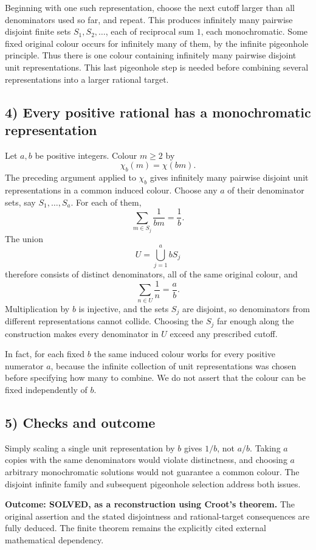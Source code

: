 Beginning with one such representation, choose the next cutoff larger
than all denominators used so far, and repeat. This produces infinitely
many pairwise disjoint finite sets $S_1,S_2,\ldots$, each of reciprocal
sum $1$, each monochromatic. Some fixed original colour occurs for
infinitely many of them, by the infinite pigeonhole principle.
Thus there is one colour containing infinitely many pairwise disjoint
unit representations. This last pigeonhole step is needed before
combining several representations into a larger rational target.

\subsection{4) Every positive rational has a monochromatic representation}
Let $a,b$ be positive integers. Colour $m\geq2$ by
\[
 \chi_b(m)=\chi(bm).
\]
The preceding argument applied to $\chi_b$ gives infinitely many
pairwise disjoint unit representations in a common induced colour.
Choose any $a$ of their denominator sets, say $S_1,\ldots,S_a$.
For each of them,
\[
 \sum_{m\in S_j}\frac1{bm}=\frac1b.
\]
The union
\[
 U=\bigcup_{j=1}^a bS_j
\]
therefore consists of distinct denominators, all of the same original
colour, and
\[
 \sum_{n\in U}\frac1n=\frac ab.
\]
Multiplication by $b$ is injective, and the sets $S_j$ are disjoint,
so denominators from different representations cannot collide.
Choosing the $S_j$ far enough along the construction makes every
denominator in $U$ exceed any prescribed cutoff.

In fact, for each fixed $b$ the same induced colour works for every
positive numerator $a$, because the infinite collection of unit
representations was chosen before specifying how many to combine.
We do not assert that the colour can be fixed independently of $b$.

\subsection{5) Checks and outcome}
Simply scaling a single unit representation by $b$ gives $1/b$, not
$a/b$. Taking $a$ copies with the same denominators would violate
distinctness, and choosing $a$ arbitrary monochromatic solutions
would not guarantee a common colour. The disjoint infinite family
and subsequent pigeonhole selection address both issues.

\textbf{Outcome: SOLVED, as a reconstruction using Croot's theorem.}
The original assertion and the stated disjointness and rational-target
consequences are fully deduced. The finite theorem remains the
explicitly cited external mathematical dependency.

